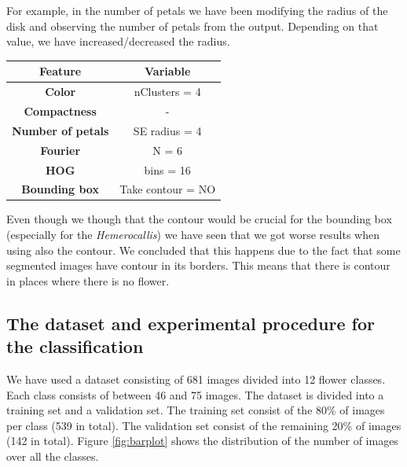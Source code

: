 \documentclass[11]{article}
\begin{document}
For example, in the number of petals we have been modifying the radius of the disk and observing the number of petals from the output. Depending on that value, we have increased/decreased the radius.
\\
\begin{center}
\centering
\begin{tabular}{ |c|c| } 
 \hline
 \textbf{Feature} & \textbf{Variable}  \\ 
   \hline
  \hline
 \textbf{Color} & nClusters = 4  \\ 
  \hline
 \textbf{Compactness} & -  \\ 
   \hline
 \textbf{Number of petals} & SE radius = 4  \\ 
   \hline
 \textbf{Fourier} & N = 6  \\ 
   \hline
 \textbf{HOG} & bins = 16  \\ 
   \hline
 \textbf{Bounding box} & Take contour = NO  \\ 
 \hline
\end{tabular}
\end{center}

\medskip

Even though we though that the contour would be crucial for the bounding box (especially for the \textit{Hemerocallis}) we have seen that we got worse results when using also the contour. We concluded that this happens due to the fact that some segmented images have contour in its borders. This means that there is contour in places where there is no flower.

\subsection{The dataset and experimental procedure for the classification}

We have used a dataset consisting of 681 images divided into 12 flower classes. Each class consists of between 46 and 75 images. The dataset is divided into a training set and a validation set. The training set consist of the 80\% of images per class (539 in total). The validation set consist of the remaining 20\% of images (142 in total). Figure \ref{fig:barplot} shows the distribution of the number of images over all the classes. 
\end{document}
